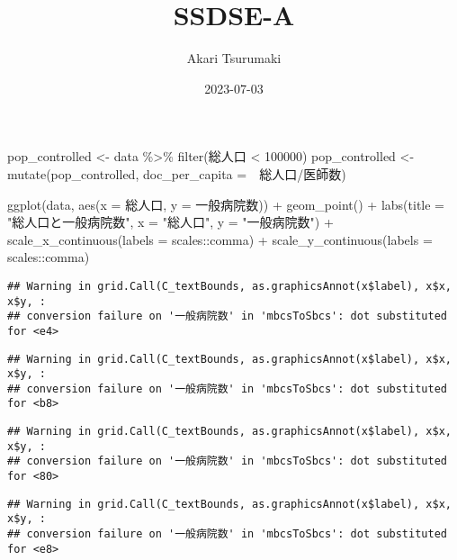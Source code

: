 \documentclass[
]{article}
\title{SSDSE-A}
\author{Akari Tsurumaki}
\date{2023-07-03}
\newenvironment{Shaded}{\begin{snugshade}}{\end{snugshade}}
\newcommand{\AttributeTok}[1]{\textcolor[rgb]{0.77,0.63,0.00}{#1}}
\newcommand{\DecValTok}[1]{\textcolor[rgb]{0.00,0.00,0.81}{#1}}
\newcommand{\FunctionTok}[1]{\textcolor[rgb]{0.00,0.00,0.00}{#1}}
\newcommand{\NormalTok}[1]{#1}
\newcommand{\OtherTok}[1]{\textcolor[rgb]{0.56,0.35,0.01}{#1}}
\newcommand{\SpecialCharTok}[1]{\textcolor[rgb]{0.00,0.00,0.00}{#1}}
\newcommand{\StringTok}[1]{\textcolor[rgb]{0.31,0.60,0.02}{#1}}
\begin{document}
\maketitle

\begin{Shaded}
\begin{Highlighting}[]
\NormalTok{pop\_controlled }\OtherTok{\textless{}{-}}\NormalTok{ data }\SpecialCharTok{\%\textgreater{}\%}
  \FunctionTok{filter}\NormalTok{(総人口 }\SpecialCharTok{\textless{}} \DecValTok{100000}\NormalTok{)}
\NormalTok{pop\_controlled }\OtherTok{\textless{}{-}} \FunctionTok{mutate}\NormalTok{(pop\_controlled, }\AttributeTok{doc\_per\_capita =}\NormalTok{　総人口}\SpecialCharTok{/}\NormalTok{医師数)}

\FunctionTok{ggplot}\NormalTok{(data, }\FunctionTok{aes}\NormalTok{(}\AttributeTok{x =}\NormalTok{ 総人口, }\AttributeTok{y =}\NormalTok{ 一般病院数)) }\SpecialCharTok{+} \FunctionTok{geom\_point}\NormalTok{() }\SpecialCharTok{+} 
  \FunctionTok{labs}\NormalTok{(}\AttributeTok{title =} \StringTok{"総人口と一般病院数"}\NormalTok{, }\AttributeTok{x =} \StringTok{"総人口"}\NormalTok{, }\AttributeTok{y =} \StringTok{"一般病院数"}\NormalTok{) }\SpecialCharTok{+}
  \FunctionTok{scale\_x\_continuous}\NormalTok{(}\AttributeTok{labels =}\NormalTok{ scales}\SpecialCharTok{::}\NormalTok{comma) }\SpecialCharTok{+}
  \FunctionTok{scale\_y\_continuous}\NormalTok{(}\AttributeTok{labels =}\NormalTok{ scales}\SpecialCharTok{::}\NormalTok{comma)}
\end{Highlighting}
\end{Shaded}

\begin{verbatim}
## Warning in grid.Call(C_textBounds, as.graphicsAnnot(x$label), x$x, x$y, :
## conversion failure on '一般病院数' in 'mbcsToSbcs': dot substituted for <e4>
\end{verbatim}

\begin{verbatim}
## Warning in grid.Call(C_textBounds, as.graphicsAnnot(x$label), x$x, x$y, :
## conversion failure on '一般病院数' in 'mbcsToSbcs': dot substituted for <b8>
\end{verbatim}

\begin{verbatim}
## Warning in grid.Call(C_textBounds, as.graphicsAnnot(x$label), x$x, x$y, :
## conversion failure on '一般病院数' in 'mbcsToSbcs': dot substituted for <80>
\end{verbatim}

\begin{verbatim}
## Warning in grid.Call(C_textBounds, as.graphicsAnnot(x$label), x$x, x$y, :
## conversion failure on '一般病院数' in 'mbcsToSbcs': dot substituted for <e8>
\end{verbatim}
\end{document}
